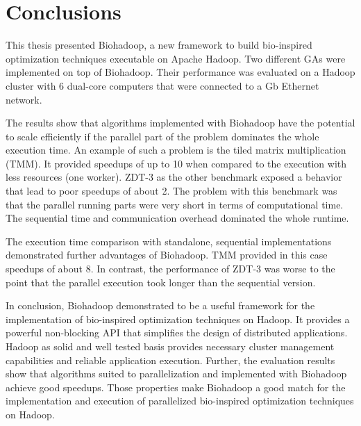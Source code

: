 \chapter{Conclusions}
\label{chap:conclusions}
This thesis presented Biohadoop, a new framework to build bio-inspired optimization techniques executable on Apache Hadoop. Two different GAs were implemented on top of Biohadoop. Their performance was evaluated on a Hadoop cluster with 6 dual-core computers that were connected to a \unit[1]{Gb} Ethernet network.

The results show that algorithms implemented with Biohadoop have the potential to scale efficiently if the parallel part of the problem dominates the whole execution time. An example of such a problem is the tiled matrix multiplication (TMM). It provided speedups of up to 10 when compared to the execution with less resources (one worker). ZDT-3 as the other benchmark exposed a behavior that lead to poor speedups of about 2. The problem with this benchmark was that the parallel running parts were very short in terms of computational time. The sequential time and communication overhead dominated the whole runtime.

The execution time comparison with standalone, sequential implementations demonstrated further advantages of Biohadoop. TMM provided in this case speedups of about 8. In contrast, the performance of ZDT-3 was worse to the point that the parallel execution took longer than the sequential version.

In conclusion, Biohadoop demonstrated to be a useful framework for the implementation of bio-inspired optimization techniques on Hadoop. It provides a powerful non-blocking API that simplifies the design of distributed applications. Hadoop as solid and well tested basis provides necessary cluster management capabilities and reliable application execution. Further, the evaluation results show that algorithms suited to parallelization and implemented with Biohadoop achieve good speedups. Those properties make Biohadoop a good match for the implementation and execution of parallelized bio-inspired optimization techniques on Hadoop.